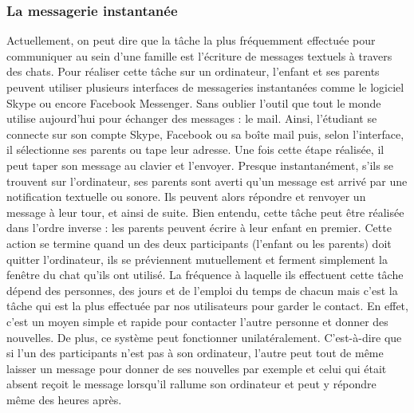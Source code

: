 \documentclass[12pt]{article}
\begin{document}
\subsubsection{La messagerie instantanée}
Actuellement, on peut dire que la tâche la plus fréquemment effectuée pour communiquer au sein d'une famille est l'écriture de messages textuels à travers des chats. Pour réaliser cette tâche sur un ordinateur, l'enfant et ses parents peuvent utiliser plusieurs interfaces de messageries instantanées comme le logiciel Skype ou encore Facebook Messenger. Sans oublier l'outil que tout le monde utilise aujourd'hui pour échanger des messages : le mail. Ainsi, l'étudiant se connecte sur son compte Skype, Facebook ou sa boîte mail puis, selon l'interface, il sélectionne ses parents ou tape leur adresse. Une fois cette étape réalisée, il peut taper son message au clavier et l'envoyer. Presque instantanément, s'ils se trouvent sur l'ordinateur, ses parents sont averti qu'un message est arrivé par une notification textuelle ou sonore. Ils peuvent alors répondre et renvoyer un message à leur tour, et ainsi de suite. Bien entendu, cette tâche peut être réalisée dans l'ordre inverse : les parents peuvent écrire à leur enfant en premier. Cette action se termine quand un des deux participants (l'enfant ou les parents) doit quitter l'ordinateur, ils se préviennent mutuellement et ferment simplement la fenêtre du chat qu'ils ont utilisé. La fréquence à laquelle ils effectuent cette tâche dépend des personnes, des jours et de l'emploi du temps de chacun mais c'est la tâche qui est la plus effectuée par nos utilisateurs pour garder le contact. En effet, c'est un moyen simple et rapide pour contacter l'autre personne et donner des nouvelles. De plus, ce système peut fonctionner unilatéralement. C'est-à-dire que si l'un des participants n'est pas à son ordinateur, l'autre peut tout de même laisser un message pour donner de ses nouvelles par exemple et celui qui était absent reçoit le message lorsqu'il rallume son ordinateur et peut y répondre même des heures après.~\\
\end{document}
